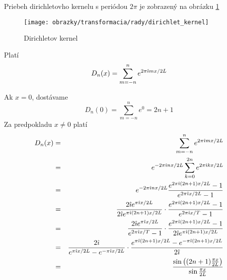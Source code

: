 Priebeh dirichletovho kernelu s periódou $2\pi$ je zobrazený na
obrázku
\ref{fig:dirichlet_kernel}

\begin{figure}[htp]
    \centering
    \texttt{[image: obrazky/transformacia/rady/dirichlet\_kernel]}
    \caption{Dirichletov kernel}
    \label{fig:dirichlet_kernel}
\end{figure}

\begin{lema}
    Platí
    \begin{equation}
        D_n(x) = \sum_{m=-n}^{n} e^{2 \pi \hat{\imath} m x/2L}
        \label{eq:dirichlet_kernel_alternative}
    \end{equation}
\end{lema}
\begin{dokaz}
    Ak $x=0$, dostávame
    \begin{equation}
        D_n(0) = \sum_{m=-n}^{n} e^0 = 2n+1
    \end{equation}
    Za predpokladu $x\not=0$ platí
    \begin{eqnarray}
        D_n(x) &=& \sum_{m=-n}^n e^{2 \pi \hat{\imath} m x/2L} \\
               &=& e^{-2 \pi \hat{\imath} n x/2L} \sum_{k=0}^{2n} 
                        e^{2 \pi \hat{\imath} k x/2L} \\
               &=& e^{-2 \pi \hat{\imath} n x/2L} 
                \frac{e^{2 \pi \hat{\imath} (2n+1) x /2L}-1}{e^{2 \pi \hat{\imath}
                x/2L}-1} \\
                &=& \frac{2 \hat{\imath} e^{\pi\hat{\imath} x/2L}}{
                          2 \hat{\imath} e^{\pi\hat{\imath} (2n+1) x/2L}} \cdot
                \frac{e^{2 \pi \hat{\imath} (2n+1) x /2L}-1}{e^{2 \pi \hat{\imath}
                x/T}-1} \\
                &=& \frac{2 \hat{\imath} e^{\pi \hat{\imath} x/2L}}{
                    e^{2 \pi \hat{\imath} x/T}-1} \cdot
                    \frac{e^{2 \pi \hat{\imath} (2n+1) x /2L}-1}{
                        2 \hat{\imath} e^{\pi\hat{\imath} (2n+1) x/2L}}\\
                &=& \frac{2 \hat{\imath}}{
                    e^{\pi \hat{\imath} x/2L}-e^{-\pi \hat{\imath} x/2L}} \cdot
                    \frac{e^{\pi \hat{\imath} (2n+1) x /2L}-
                        e^{-\pi \hat{\imath} (2n+1) x /2L}
                    }{2 \hat{\imath}}\\
                &=& \frac{\sin\left( (2n+1)\frac{\pi x}{2L} \right)}
                        {\sin \frac{\pi x}{2L}}
    \end{eqnarray}
\end{dokaz}


